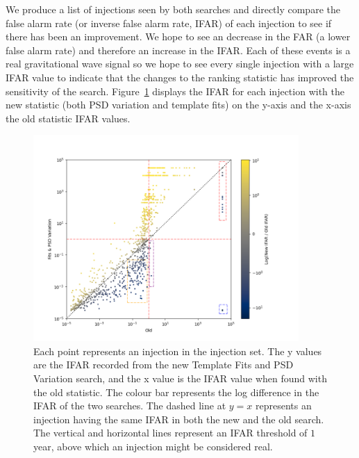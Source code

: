We produce a list of injections seen by both searches and directly compare the false alarm rate (or inverse false alarm rate, IFAR) of each injection to see if there has been an improvement. We hope to see an decrease in the FAR (a lower false alarm rate) and therefore an increase in the IFAR. Each of these events is a real gravitational wave signal so we hope to see every single injection with a large IFAR value to indicate that the changes to the ranking statistic has improved the sensitivity of the search. Figure~\ref{fig:pycbclive-ifar-ifar-psdvar-4s} displays the IFAR for each injection with the new statistic (both PSD variation and template fits) on the y-axis and the x-axis the old statistic IFAR values.
%
\begin{figure}
  \centering
  \begin{minipage}[t]{1.0\linewidth}
  
    \includegraphics[width=0.9\textwidth]{images/pycbclive/psdvar_4s_ifar_vs_ifar_regions.png}
    \caption{Each point represents an injection in the injection set. The y values are the IFAR recorded from the new Template Fits and PSD Variation search, and the x value is the IFAR value when found with the old statistic. The colour bar represents the log difference in the IFAR of the two searches. The dashed line at $y=x$ represents an injection having the same IFAR in both the new and the old search. The vertical and horizontal lines represent an IFAR threshold of $1$ year, above which an injection might be considered real.}
    \label{fig:pycbclive-ifar-ifar-psdvar-4s}
  

\end{minipage}
\end{figure}
